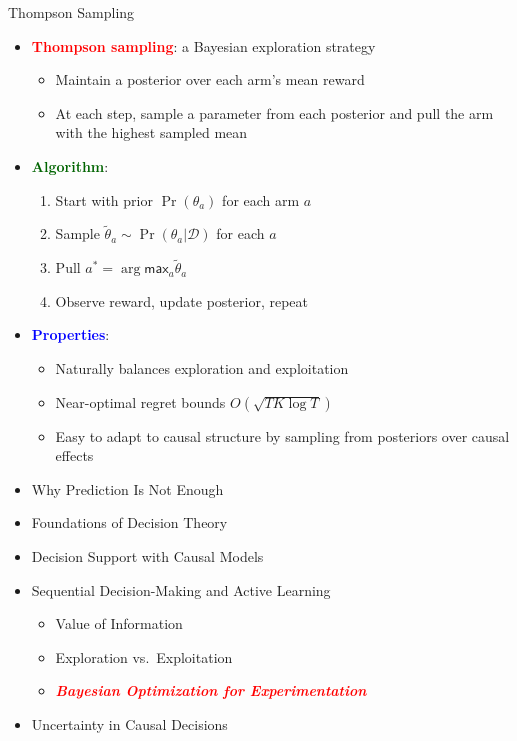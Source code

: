 \documentclass[
  10pt,
  ignorenonframetext,
]{beamer}
\providecommand{\tightlist}{%
  \setlength{\itemsep}{0pt}\setlength{\parskip}{0pt}}
\def\max{\textsf{max}}
\begin{document}
\begin{frame}{Thompson Sampling}
\label{thompson-sampling}
\begin{itemize}
\tightlist
\item
  \textbf{\textcolor{red}{Thompson sampling}}: a Bayesian exploration
  strategy

  \begin{itemize}
  \tightlist
  \item
    Maintain a posterior over each arm's mean reward
  \item
    At each step, sample a parameter from each posterior and pull the
    arm with the highest sampled mean
  \end{itemize}
\item
  \textbf{\textcolor{darkgreen}{Algorithm}}:

  \begin{enumerate}
  \tightlist
  \item
    Start with prior \(\Pr(\theta_a)\) for each arm \(a\)
  \item
    Sample \(\tilde\theta_a \sim \Pr(\theta_a | \mathcal{D})\) for each
    \(a\)
  \item
    Pull \(a^* = \arg\max_a \tilde\theta_a\)
  \item
    Observe reward, update posterior, repeat
  \end{enumerate}
\item
  \textbf{\textcolor{blue}{Properties}}:

  \begin{itemize}
  \tightlist
  \item
    Naturally balances exploration and exploitation
  \item
    Near-optimal regret bounds \(O(\sqrt{T K \log T})\)
  \item
    Easy to adapt to causal structure by sampling from posteriors over
    causal effects
  \end{itemize}
\end{itemize}
\end{frame}

\begin{frame}{}
\label{section-15}
\begin{itemize}
\tightlist
\item
  Why Prediction Is Not Enough
\item
  Foundations of Decision Theory
\item
  Decision Support with Causal Models
\item
  Sequential Decision-Making and Active Learning

  \begin{itemize}
  \tightlist
  \item
    Value of Information
  \item
    Exploration vs.~Exploitation
  \item
    \emph{\textbf{\textcolor{red}{Bayesian Optimization for Experimentation}}}
  \end{itemize}
\item
  Uncertainty in Causal Decisions
\end{itemize}
\end{frame}
\end{document}
